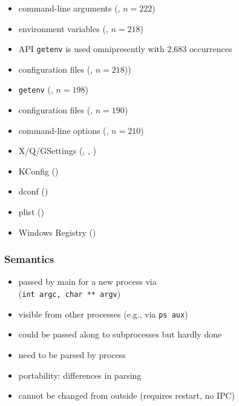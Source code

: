 \begin{frame}
	\methodQuestion{} 
	\begin{itemize}
	\item command-line arguments (, $n=222$)
	\item environment variables (, $n=218$)
	\item \methodSource{} API \texttt{getenv} is used omnipresently with 2,683 occurrences
	\item configuration files (, $n=218$))
	\end{itemize}
\end{frame}


\begin{frame}
	\methodQuestion{} 
	\begin{itemize}
	\item \texttt{getenv} (, $n=198$)
	\item configuration files (, $n=190$)
	\item command-line options (, $n=210$)
	\item X/Q/GSettings (, , )
	\item KConfig ()
	\item dconf ()
	\item plist ()
	\item Windows Registry ()
	\end{itemize}
\end{frame}


\begin{frame}
	\frametitle{Semantics}
	\begin{itemize}
	\item passed by main for a new process via \\ (\texttt{int argc, char ** argv})
	\item visible from other processes (e.g., via \texttt{ps aux})
	\item could be passed along to subprocesses but hardly done
	\item need to be parsed by process
	\item portability: differences in parsing
	\item cannot be changed from outside (requires restart, no IPC)
	\end{itemize}
\end{frame}



